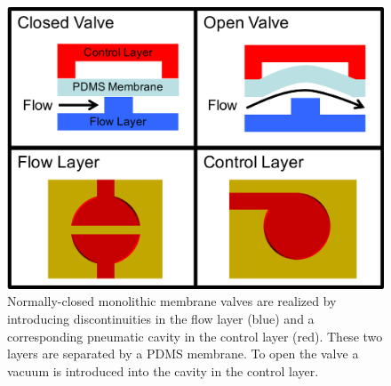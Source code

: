 \begin{figure}[h]
  \begin{minipage}[t]{0.99\linewidth}\centering
    \includegraphics[width=14cm]{valves1.pdf}
    \medskip
  \end{minipage}\hfill
  \caption[Illustration of valving primitive]{Normally-closed monolithic membrane valves \cite{grover2003monolithic} are realized by introducing discontinuities in the flow layer (blue) and a corresponding pneumatic cavity in the control layer (red). These two layers are separated by a PDMS membrane. To open the valve a vacuum is introduced into the cavity in the control layer.}
    \label{fig:valves}
\end{figure}

